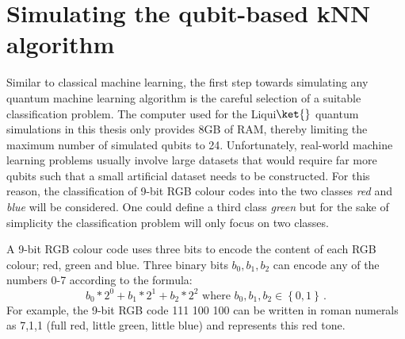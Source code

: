 \section{Simulating the qubit-based kNN algorithm}
\label{subsec:qubitKNNresults}

Similar to classical machine learning, the first step towards simulating any quantum machine learning algorithm is the careful selection of a suitable classification problem. The computer used for the Liqui$\ket{}$ quantum simulations in this thesis only provides 8GB of RAM, thereby limiting the maximum number of simulated qubits to 24. Unfortunately, real-world machine learning problems usually involve large datasets that would require far more qubits such that a small artificial dataset needs to be constructed. For this reason, the classification of 9-bit RGB colour codes into the two classes \emph{red} and \emph{blue} will be considered. One could define a third class \emph{green} but for the sake of simplicity the classification problem will only focus on two classes.

A 9-bit RGB colour code uses three bits to encode the content of each RGB colour; red, green and blue. Three binary bits $b_0,b_1,b_2$ can encode any of the numbers 0-7 according to the formula:
\begin{equation}
b_0*2^0 + b_1*2^1 + b_2*2^2 \text{ where } b_0,b_1,b_2 \in \left\{0,1\right\}\, .
\end{equation}
For example, the 9-bit RGB code 111 100 100 can be written in roman numerals as 7,1,1 (full red, little green, little blue) and represents \colorbox{examplered}{this red tone}.

\pagebreak

